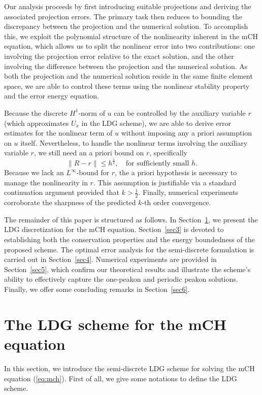\documentclass[11pt]{article}
\numberwithin{equation}{section}
\begin{document}
Our analysis proceeds by first introducing suitable projections and deriving the associated projection errors. The primary task then reduces to bounding the discrepancy between the projection and the numerical solution. To accomplish this, we exploit the polynomial structure of the nonlinearity inherent in the mCH equation, which allows us to split the nonlinear error into two contributions: one involving the projection error relative to the exact solution, and the other involving the difference between the projection and the numerical solution. As both the projection and the numerical solution reside in the same finite element space, we are able to control these terms using the nonlinear stability property and the error energy equation.

Because the discrete $H^1$-norm of $u$ can be controlled by the auxiliary variable $r$ (which approximates $U_x$ in the LDG scheme), we are able to derive error estimates for the nonlinear term of $u$ without imposing any a priori assumption on $u$ itself. Nevertheless, to handle the nonlinear terms involving the auxiliary variable $r$, we still need an a priori bound on $r$, specifically
\[
\|R-r\| \leq h^{\frac 12}, \quad \text{for sufficiently small }h.
\]
Because we lack an $L^\infty$-bound for $r$, the a priori hypothesis is necessary to manage the nonlinearity in $r$. This assumption is justifiable via a standard continuation argument provided that $k > \frac12$. Finally, numerical experiments corroborate the sharpness of the predicted $k$-th order convergence.

The remainder of this paper is structured as follows. In Section~\ref{sec2}, we present the LDG discretization for the mCH equation. Section~\ref{sec3} is devoted to establishing both the conservation properties and the energy boundedness of the proposed scheme. The optimal error analysis for the semi-discrete formulation is carried out in Section~\ref{sec4}. Numerical experiments are provided in Section~\ref{sec5}, which confirm our theoretical results and illustrate the scheme's ability to effectively capture the one-peakon and periodic peakon solutions. Finally, we offer some concluding remarks in Section~\ref{sec6}.



\section{The LDG scheme for the mCH equation} \label{sec2}
\setcounter{equation}{0}
In this section, we introduce the semi-discrete LDG scheme for solving the mCH equation (\ref{eq:mch}). First of all, we give some notations to define the LDG scheme.
\end{document}
